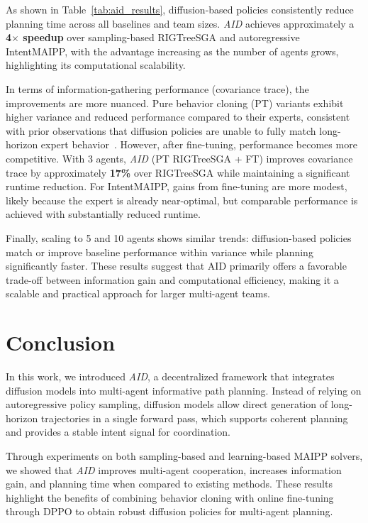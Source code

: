 \documentclass[runningheads]{llncs}
\begin{document}
As shown in Table~\ref{tab:aid_results}, diffusion-based policies consistently reduce planning time across all baselines and team sizes. \textit{AID} achieves approximately a \textbf{4$\times$ speedup} over sampling-based RIGTreeSGA and autoregressive IntentMAIPP, with the advantage increasing as the number of agents grows, highlighting its computational scalability.

In terms of information-gathering performance (covariance trace), the improvements are more nuanced. Pure behavior cloning (PT) variants exhibit higher variance and reduced performance compared to their experts, consistent with prior observations that diffusion policies are unable to fully match long-horizon expert behavior~\cite{chi2024diffusionpolicy,dppo2024}. However, after fine-tuning, performance becomes more competitive. With 3 agents, \textit{AID} (PT RIGTreeSGA + FT) improves covariance trace by approximately \textbf{17\%} over RIGTreeSGA while maintaining a significant runtime reduction. For IntentMAIPP, gains from fine-tuning are more modest, likely because the expert is already near-optimal, but comparable performance is achieved with substantially reduced runtime.

Finally, scaling to 5 and 10 agents shows similar trends: diffusion-based policies match or improve baseline performance within variance while planning significantly faster. These results suggest that AID primarily offers a favorable trade-off between information gain and computational efficiency, making it a scalable and practical approach for larger multi-agent teams.

\section{Conclusion}
In this work, we introduced \textit{AID}, a decentralized framework that integrates diffusion models into multi-agent informative path planning. Instead of relying on autoregressive policy sampling, diffusion models allow direct generation of long-horizon trajectories in a single forward pass, which supports coherent planning and provides a stable intent signal for coordination.

Through experiments on both sampling-based and learning-based MAIPP solvers, we showed that \textit{AID} improves multi-agent cooperation, increases information gain, and planning time when compared to existing methods. These results highlight the benefits of combining behavior cloning with online fine-tuning through DPPO to obtain robust diffusion policies for multi-agent planning.
\end{document}
